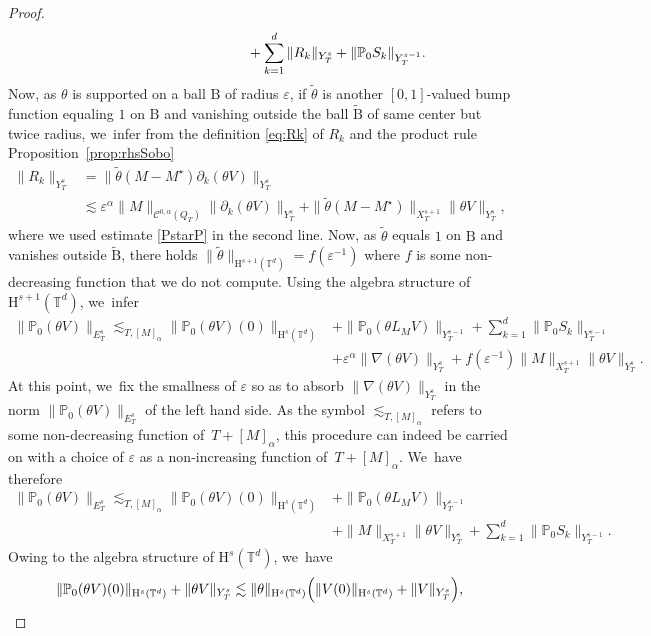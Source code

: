 \documentclass[JEP,XML,SOM,Unicode,published]{cedram}
\theoremstyle{definition}
\newcommand\T{\mathbb{T}}
\newcommand\B{\mathrm{B}}
\renewcommand\H{\mathrm{H}}
\let\ep\varepsilon
\begin{document}
\begin{proof}
\begin{align*}
&\hspace*{4.2cm}+ \sum_{k=1}^d \|R_k\|_{Y_T^s} +\|\mathbb{P}_0S_k\|_{Y_T^{s-1}}.
\end{align*}
Now, as $\theta$ is supported on a ball $\B$ of radius $\ep$, if $\widetilde{\theta}$ is another $[0,1]$-valued bump function equaling $1$ on $\B$ and vanishing outside the ball $\widetilde{\B}$ of same center but twice radius, we~infer from the definition \eqref{eq:Rk} of $R_k$ and the product rule Proposition~\ref{prop:rhsSobo}
\begin{align*}
\|R_k\|_{Y_T^s} &= \|\widetilde{\theta}(M-M^\star)\partial_k(\theta V)\|_{Y_T^s} \\
&\lesssim \ep^{\alpha} \|M\|_{\mathscr{C}^{0,\alpha}(Q_T)}\|\partial_k(\theta V)\|_{Y_T^s} + \|\widetilde{\theta}(M-M^\star)\|_{X_T^{s+1}}\|\theta V\|_{Y_T^s},
\end{align*}
where we used estimate \eqref{PstarP} in the second line. Now, as $\widetilde{\theta}$ equals $1$ on $\B$ and vanishes outside $\widetilde{\B}$, there holds $\|\widetilde{\theta}\|_{\H^{s+1}(\T^d)} = f(\ep^{-1})$ where $f$ is some non-decreasing function that we do not compute. Using the algebra structure of $\H^{s+1}(\T^d)$, we~infer
\vspace{-0.3cm}
\begin{align*}
\|\mathbb{P}_0(\theta V)\|_{E_T^s} \lesssim_{T,[M]_\alpha}
\|\mathbb{P}_0(\theta V)(0)\|_{\H^s(\T^d)} &+ \| \mathbb{P}_0(\theta L_{M} V)\|_{Y_T^{s-1}} + \sum_{k=1}^d \|\mathbb{P}_0S_k\|_{Y_T^{s-1}}\\
&+ \ep^\alpha \|\nabla(\theta V)\|_{Y_T^s} + f(\ep^{-1})\|M\|_{X_T^{s+1}}\|\theta V\|_{Y_T^s}.
\end{align*}
At this point, we~fix the smallness of $\ep$ so as to absorb $\|\nabla(\theta V)\|_{Y_T^s}$ in the norm $\|\mathbb{P}_0(\theta V)\|_{E_T^s}$ of the left hand side. As the symbol $\lesssim_{T,[M]_\alpha}$ refers to some non-decreasing function of~$T+[M]_\alpha$, this procedure can indeed be carried on with a choice of $\ep$ as a non-increasing function of~$T+[M]_\alpha$. We~have therefore
\begin{align*}
\|\mathbb{P}_0(\theta V)\|_{E_T^s} \lesssim_{T,[M]_\alpha}
\|\mathbb{P}_0(\theta V)(0)\|_{\H^s(\T^d)} &+ \|\mathbb{P}_0(\theta L_{M} V)\|_{Y_T^{s-1}} \\
&+ \|M\|_{X_T^{s+1}}\|\theta V\|_{Y_T^s} +\sum_{k=1}^d \|\mathbb{P}_0S_k\|_{Y_T^{s-1}}.
\end{align*}
Owing to the algebra structure of $\H^s(\T^d)$, we~have
\[
\|\mathbb{P}_0(\theta V)(0)\|_{\H^s(\T^d)} + \|\theta V\|_{Y_T^s} \lesssim \|\theta\|_{\H^s(\T^d)} \Bigl(\|V(0)\|_{\H^s(\T^d)} + \|V\|_{Y_T^s}\Bigr),
\]
\end{proof}
\end{document}
